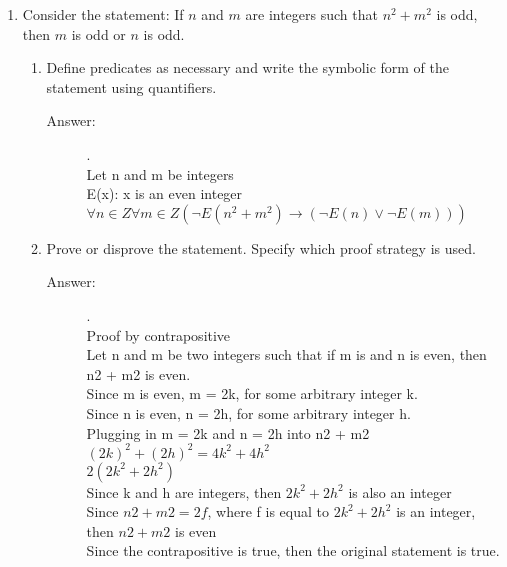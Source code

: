 \documentclass[12pt, oneside]{article}
\begin{document}
\begin{enumerate}
\begin{enumerate}
\end{enumerate}


\quad

\item Consider the statement: If $n$ and $m$ are integers such that $n^2+m^2$ is odd, then $m$ is odd or $n$ is odd.
\begin{enumerate}
    \item Define predicates as necessary and write the symbolic form of the statement using quantifiers.
    \begin{description}
        \item[Answer:].\\
        Let n and m be integers\\
        E(x): x is an even integer\\
        $\forall n \in Z \forall m \in Z(\lnot E(n^2+m^2) \rightarrow (\lnot E(n) \lor \lnot E(m)))$

    \end{description}
    \item Prove or disprove the statement. Specify which proof strategy is used.
    \begin{description}
        \item[Answer:].\\
        Proof by contrapositive\\
        Let n and m be two integers such that if m is and n is even, then n2 + m2  is even.\\
        Since m is even, m = 2k, for some arbitrary integer k.\\
        Since n is even, n = 2h, for some arbitrary integer h. \\
        Plugging in m = 2k  and n = 2h into n2 + m2\\
        $(2k)^2 + (2h)^2 = 4k^2 + 4h^2$ \\
        $2(2k^2 + 2h^2)$\\
        Since k and h are integers, then $2k^2 + 2h^2$ is also an integer\\
        Since $n2 + m2 = 2f$, where f is equal to $2k^2 + 2h^2$ is an integer, then $n2 + m2$ is even\\
        Since the contrapositive is true, then the original statement is true.
    \end{description}
\end{enumerate}

\quad


\end{enumerate}
\end{document}

